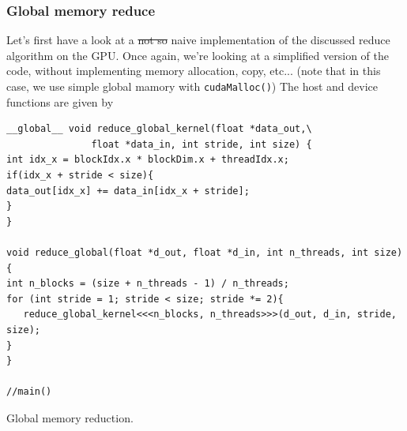 \documentclass[12pt]{article}
\begin{document}
\subsubsection*{Global memory reduce}
Let's first have a look at a \sout{not so} naive implementation of the discussed reduce algorithm on the GPU.
Once again, we're looking at a simplified version of the code, without implementing memory allocation, copy, etc... 
(note that in this case, we use simple global mamory with \verb|cudaMalloc()|) The host and device functions are given by


\begin{listing}
\begin{verbatim}
__global__ void reduce_global_kernel(float *data_out,\
               float *data_in, int stride, int size) {
int idx_x = blockIdx.x * blockDim.x + threadIdx.x;
if(idx_x + stride < size){
data_out[idx_x] += data_in[idx_x + stride];
}
}

void reduce_global(float *d_out, float *d_in, int n_threads, int size) {
int n_blocks = (size + n_threads - 1) / n_threads;
for (int stride = 1; stride < size; stride *= 2){
   reduce_global_kernel<<<n_blocks, n_threads>>>(d_out, d_in, stride, size);
}
}

//main()
\end{verbatim}
    \caption{Global memory reduction. \cite{tuomanen2018hands}}
\end{listing}
\end{document}
